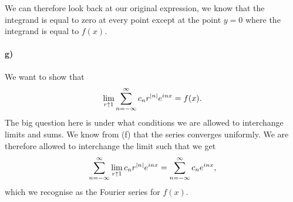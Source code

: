 \documentclass[a4paper]{article}
\begin{document}
We can therefore look back at our original expression, we know that the
integrand is equal to zero at every point except at the point $y = 0$ where the
integrand is equal to $f(x)$.

\paragraph{g)}
We want to show that
\begin{equation}
  \notag
  \lim\limits_{r\uparrow 1}\sum_{n=-\infty}^{\infty} c_nr^{|n|}e^{inx} = f(x).
\end{equation}
The big question here is under what conditions we are allowed to interchange limits and sums.
We know from (f) that the series converges uniformly. We are therefore allowed to interchange the limit
such that we get
\begin{equation}
  \notag
  \sum_{n=-\infty}^{\infty}\lim\limits_{r\uparrow 1} c_nr^{|n|}e^{inx} = \sum_{n=-\infty}^{\infty}c_ne^{inx},
\end{equation}
which we recognise as the Fourier series for $f(x)$.
\end{document}
